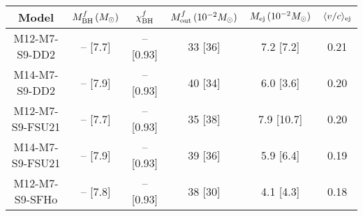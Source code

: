 \begin{tabular}{c cc ccc}
	\toprule \toprule
	Model & $M_{\rm BH}^f\,(M_\odot)$ & $\chi_{\rm BH}^f$ & $M_{\rm out}^f\,(10^{-2} M_\odot)$ & $M_{\rm ej}\,(10^{-2} M_\odot)$ & $\langle v/c \rangle_{\rm ej}$\\
	\midrule
	M12-M7-S9-DD2 & -- [7.7] & -- [0.93] & 33 [36] & 7.2 [7.2] & 0.21\\
	M14-M7-S9-DD2 & -- [7.9] & -- [0.93] & 40 [34] & 6.0 [3.6] & 0.20\\
	M12-M7-S9-FSU21 & -- [7.7] & -- [0.93] & 35 [38] & 7.9 [10.7] & 0.20\\
	M14-M7-S9-FSU21 & -- [7.9] & -- [0.93] & 39 [36] & 5.9 [6.4] & 0.19\\
	M12-M7-S9-SFHo & -- [7.8] & -- [0.93] & 38 [30] &  4.1 [4.3] & 0.18\\
	\bottomrule \bottomrule
\end{tabular}